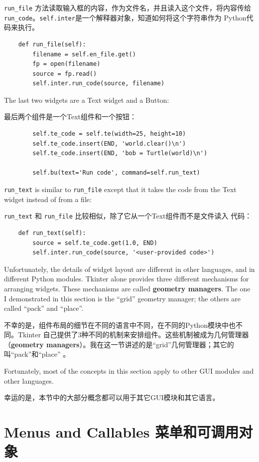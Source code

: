 \documentclass[10pt]{book}
\begin{document}
\begin{CJK}{UTF8}{gbsn}
\verb"run_file" 方法读取输入框的内容，作为文件名，并且读入这个文件，将内容传给
\verb"run_code"。{\tt self.inter}是一个解释器对象，知道如何将这个字符串作为
Python代码来执行。

\begin{verbatim}
    def run_file(self):
        filename = self.en_file.get()
        fp = open(filename)
        source = fp.read()
        self.inter.run_code(source, filename)
\end{verbatim}
%
The last two widgets are a Text widget and a Button:

最后两个组件是一个Text组件和一个按钮：

\begin{verbatim}
        self.te_code = self.te(width=25, height=10)
        self.te_code.insert(END, 'world.clear()\n')
        self.te_code.insert(END, 'bob = Turtle(world)\n')

        self.bu(text='Run code', command=self.run_text)
\end{verbatim}
%
\verb"run_text" is similar to \verb"run_file" except that it takes
the code from the Text widget instead of from a file:

\verb"run_text" 和 \verb"run_file" 比较相似，除了它从一个Text组件而不是文件读入
代码：

\begin{verbatim}
    def run_text(self):
        source = self.te_code.get(1.0, END)
        self.inter.run_code(source, '<user-provided code>')
\end{verbatim}
%
Unfortunately, the details of widget layout are different in
other languages, and in different Python modules.
Tkinter alone provides three different mechanisms for arranging
widgets.  These mechanisms are called {\bf geometry managers}.
The one I demonstrated in this section is the ``grid'' geometry
manager; the others are called ``pack'' and ``place''.

不幸的是，组件布局的细节在不同的语言中不同，在不同的Python模块中也不同。Tkinter
自己提供了3种不同的机制来安排组件。这些机制被成为几何管理器（{\bf geometry
managers}）。我在这一节讲述的是``grid''几何管理器；其它的叫``pack''和``place''
。

Fortunately, most of the concepts in this section apply to
other GUI modules and other languages.

幸运的是，本节中的大部分概念都可以用于其它GUI模块和其它语言。

\section{Menus and Callables 菜单和可调用对象}


\end{CJK}
\end{document}
